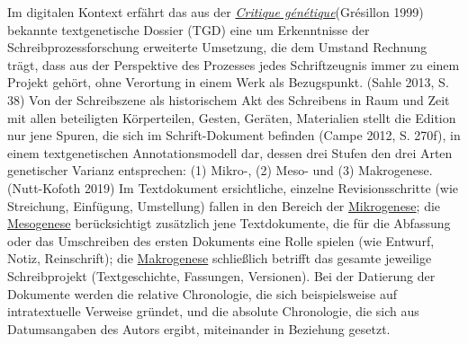 \documentclass{article}
\begin{document}
    Im digitalen Kontext erfährt das aus der \emph{\href{http://gams.uni-graz.at/o:konde.46}{Critique génétique}}(Grésillon 1999) bekannte textgenetische Dossier (TGD) eine um
                  Erkenntnisse der Schreibprozessforschung erweiterte Umsetzung, die dem Umstand
                  Rechnung trägt, dass aus der Perspektive des Prozesses jedes Schriftzeugnis immer
                  zu einem Projekt gehört, ohne Verortung in einem Werk als Bezugspunkt.
                     (Sahle 2013, S. 38) Von der Schreibszene als historischem Akt des
                  Schreibens in Raum und Zeit mit allen beteiligten Körperteilen, Gesten, Geräten,
                  Materialien stellt die Edition nur jene Spuren, die sich im Schrift-Dokument
                  befinden (Campe 2012, S. 270f), in einem textgenetischen
                  Annotationsmodell dar, dessen drei Stufen den drei Arten genetischer Varianz
                  entsprechen: (1) Mikro-, (2) Meso- und (3) Makrogenese. (Nutt-Kofoth
                     2019) Im Textdokument ersichtliche, einzelne Revisionsschritte (wie
                  Streichung, Einfügung, Umstellung) fallen in den Bereich der \href{http://gams.uni-graz.at/o:konde.25}{Mikrogenese}; die \href{http://gams.uni-graz.at/o:konde.24}{Mesogenese} berücksichtigt zusätzlich jene
                  Textdokumente, die für die Abfassung oder das Umschreiben des ersten Dokuments
                  eine Rolle spielen (wie Entwurf, Notiz, Reinschrift); die \href{http://gams.uni-graz.at/o:konde.23}{Makrogenese} schließlich betrifft das gesamte
                  jeweilige Schreibprojekt (Textgeschichte, Fassungen, Versionen). Bei der Datierung
                  der Dokumente werden die relative Chronologie, die sich beispielsweise auf
                  intratextuelle Verweise gründet, und die absolute Chronologie, die sich aus
                  Datumsangaben des Autors ergibt, miteinander in Beziehung gesetzt. \\
            
\end{document}
